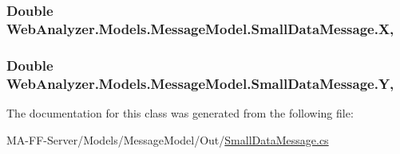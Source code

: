 \subsubsection[{X}]{\setlength{\rightskip}{0pt plus 5cm}Double Web\+Analyzer.\+Models.\+Message\+Model.\+Small\+Data\+Message.\+X\hspace{0.3cm}{\ttfamily [get]}, {\ttfamily [set]}}\label{class_web_analyzer_1_1_models_1_1_message_model_1_1_small_data_message_a26dce64be8d77b383253876ae2bbd06d}
\hypertarget{class_web_analyzer_1_1_models_1_1_message_model_1_1_small_data_message_a4214bf4d6c2c88448e32472cc14f41cd}{}
\subsubsection[{Y}]{\setlength{\rightskip}{0pt plus 5cm}Double Web\+Analyzer.\+Models.\+Message\+Model.\+Small\+Data\+Message.\+Y\hspace{0.3cm}{\ttfamily [get]}, {\ttfamily [set]}}\label{class_web_analyzer_1_1_models_1_1_message_model_1_1_small_data_message_a4214bf4d6c2c88448e32472cc14f41cd}


The documentation for this class was generated from the following file\+:\begin{DoxyCompactItemize}
\item 
M\+A-\/\+F\+F-\/\+Server/\+Models/\+Message\+Model/\+Out/\hyperlink{_small_data_message_8cs}{Small\+Data\+Message.\+cs}\end{DoxyCompactItemize}

